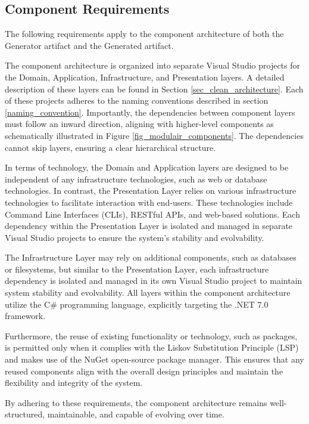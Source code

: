 \subsection{Component Requirements} \label{component_requirements}

The following requirements apply to the component architecture of both the Generator
artifact and the Generated artifact.

The component architecture is organized into separate Visual Studio projects for the
Domain, Application, Infrastructure, and Presentation layers. A detailed description of
these layers can be found in Section \ref{sec_clean_architecture}. Each of these projects adheres to
the naming conventions described in section \ref{naming_convention}. Importantly, the
dependencies between component layers must follow an inward direction, aligning with
higher-level components as schematically illustrated in Figure
\ref{fig_modulair_components}. The dependencies cannot skip layers, ensuring a clear
hierarchical structure.

In terms of technology, the Domain and Application layers are designed to be independent
of any infrastructure technologies, such as web or database technologies. In contrast, the
Presentation Layer relies on various infrastructure technologies to facilitate interaction
with end-users. These technologies include Command Line Interfaces (CLIs), RESTful APIs,
and web-based solutions. Each dependency within the Presentation Layer is isolated and
managed in separate Visual Studio projects to ensure the system's stability and
evolvability.

The Infrastructure Layer may rely on additional components, such as databases or
filesystems, but similar to the Presentation Layer, each infrastructure dependency is
isolated and managed in its own Visual Studio project to maintain system stability and
evolvability. All layers within the component architecture utilize the C\# programming
language, explicitly targeting the .NET 7.0 framework.

Furthermore, the reuse of existing functionality or technology, such as packages, is
permitted only when it complies with the Liskov Substitution Principle (LSP) and makes use
of the NuGet open-source package manager. This ensures that any reused components align
with the overall design principles and maintain the flexibility and integrity of the
system.

By adhering to these requirements, the component architecture remains well-structured,
maintainable, and capable of evolving over time.
